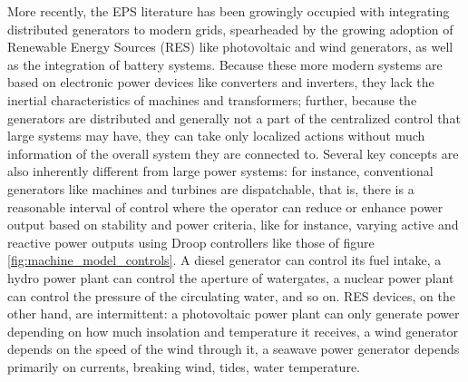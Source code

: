 	More recently, the EPS literature has been growingly occupied with integrating distributed generators to modern grids, spearheaded by the growing adoption of Renewable Energy Sources (RES) like photovoltaic and wind generators, as well as the integration of battery systems. Because these more modern systems are based on electronic power devices like converters and inverters, they lack the inertial characteristics of machines and transformers; further, because the generators are distributed and generally not a part of the centralized control that large systems may have, they can take only localized actions without much information of the overall system they are connected to. Several key concepts are also inherently different from large power systems: for instance, conventional generators like machines and turbines are dispatchable, that is, there is a reasonable interval of control where the operator can reduce or enhance power output based on stability and power criteria, like for instance, varying active and reactive power outputs using Droop controllers like those of figure \ref{fig:machine_model_controls}. A diesel generator can control its fuel intake, a hydro power plant can control the aperture of watergates, a nuclear power plant can control the pressure of the circulating water, and so on. RES devices, on the other hand, are intermittent: a photovoltaic power plant can only generate power depending on how much insolation and temperature it receives, a wind generator depends on the speed of the wind through it, a seawave power generator depends primarily on currents, breaking wind, tides, water temperature.



